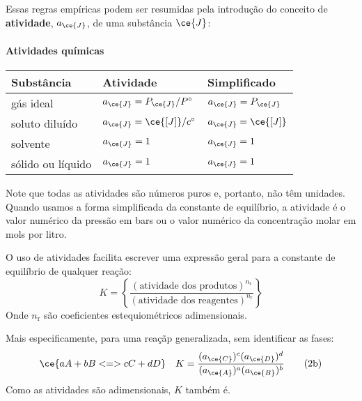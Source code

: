 Essas regras empíricas podem ser resumidas pela introdução do conceito de \textbf{atividade}, \(a_{\ce{J}}\), de uma substância \(\ce{J}\):

\begin{displaytable}

\paragraph{Atividades químicas}

\begin{longtable}[]{@{}lll@{}}
\toprule
\textbf{Substância} & \textbf{Atividade} & \textbf{Simplificado} \\
\midrule



gás ideal & \(a_{\ce{J}} = P_{\ce{J}}/P^\circ\) & \(a_{\ce{J}} = P_{\ce{J}}\) \\
soluto diluído & \(a_{\ce{J}} = \ce{[J]}/c^\circ\) & \(a_{\ce{J}} = \ce{[J]}\) \\
solvente & \(a_{\ce{J}} = 1\) & \(a_{\ce{J}} = 1\) \\
sólido ou líquido & \(a_{\ce{J}} = 1\) & \(a_{\ce{J}} = 1\) \\
\end{longtable}

\end{displaytable}

Note que todas as atividades são números puros e, portanto, não têm unidades. Quando usamos a forma simplificada da constante de equilíbrio, a
atividade é o valor numérico da pressão em bars ou o valor numérico da concentração molar em mols por litro.

O uso de atividades facilita escrever uma expressão geral para a constante de equilíbrio de qualquer reação: \[
    K = \left\{ \dfrac{ (\text{atividade dos produtos})^{n_\mathrm{r}} }{ (\text{atividade dos reagentes})^{n_\mathrm{r}} } \right\}
\tag{2a}
\] Onde \(n_\mathrm{r}\) são coeficientes estequiométricos adimensionais.

Mais especificamente, para uma reaçãp generalizada, sem identificar as fases: \[
    \ce{a A + b B <=> c C + d D } 
        \quad K = \dfrac{ (a_{\ce{C}})^c (a_{\ce{D}})^d }{ (a_{\ce{A}})^a (a_{\ce{B}})^b }
\tag{2b}
\] Como as atividades são adimensionais, \(K\) também é.

